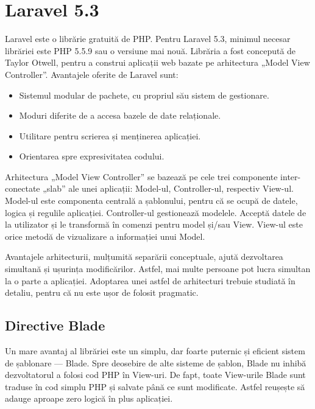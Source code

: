 \section{Laravel 5.3}

	Laravel este o librărie gratuită de PHP.
	Pentru Laravel 5.3, minimul necesar librăriei este PHP 5.5.9 sau o versiune mai nouă.
	Librăria a fost concepută de Taylor Otwell, pentru a construi aplicații web bazate pe arhitectura „Model View Controller”.
	Avantajele oferite de Laravel sunt\cite{laravel_book}:
	\begin{itemize}
		\item Sistemul modular de pachete, cu propriul său sistem de gestionare.
		\item Moduri diferite de a accesa bazele de date relaționale.
		\item Utilitare pentru scrierea și menținerea aplicației.
		\item Orientarea spre expresivitatea codului.
	\end{itemize}

	Arhitectura „Model View Controller” se bazează pe cele trei componente inter-conectate „slab” ale unei aplicații: Model-ul, Controller-ul, respectiv View-ul.
	Model-ul este componenta centrală a șablonului, pentru că se ocupă de datele, logica și regulile aplicației.
	Controller-ul gestionează modelele. Acceptă datele de la utilizator și le transformă în comenzi pentru model și/sau View.
	View-ul este orice metodă de vizualizare a informației unui Model.\cite{poo_sa}

	Avantajele arhitecturii, mulțumită separării conceptuale, ajută dezvoltarea simultană și ușurința modificărilor.
	Astfel, mai multe persoane pot lucra simultan la o parte a aplicației.
	Adoptarea unei astfel de arhitecturi trebuie studiată în detaliu, pentru că nu este ușor de folosit pragmatic.

	\subsection{Directive Blade}

		Un mare avantaj al librăriei este un simplu, dar foarte puternic și eficient sistem de șablonare --- Blade.
		Spre deosebire de alte sisteme de șablon, Blade nu inhibă dezvoltatorul a folosi cod PHP în View-uri.
		De fapt, toate View-urile Blade sunt traduse în cod simplu PHP și salvate până ce sunt modificate.
		Astfel reușește să adauge aproape zero logică în plus aplicației.

